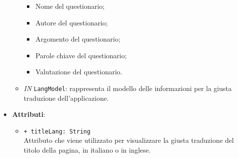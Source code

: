 \begin{itemize}
\begin{itemize}
		\begin{itemize}
			\item Nome del questionario;
			\item Autore del questionario;
			\item Argomento del questionario;
			\item Parole chiave del questionario;
			\item Valutazione del questionario.
		\end{itemize}
		\item \textit{IN} \texttt{LangModel}: rappresenta il modello delle informazioni per la giusta traduzione dell'applicazione.
	\end{itemize}
	\item \textbf{Attributi}:
		\begin{itemize}
			\item \texttt{+ titleLang: String} \\ Attributo che viene utilizzato per visualizzare la giusta traduzione del titolo della pagina, in italiano o in inglese.
		\end{itemize}
\end{itemize}


